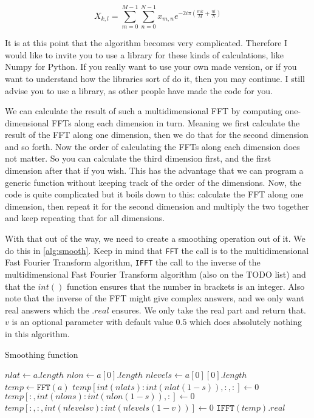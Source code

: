 \begin{equation}
    \label{eq:NFFT}
    X_{k,l} = \sum_{m = 0}^{M - 1}\sum_{n = 0}^{N - 1} x_{m, n}e^{-2i\pi(\frac{mk}{M} + \frac{nl}{N})}
\end{equation}

It is at this point that the algorithm becomes very complicated. Therefore I would like to invite you to use a library for these kinds of calculations, like Numpy \cite{numpy} for Python. If you
really want to use your own made version, or if you want to understand how the libraries sort of do it, then you may continue. I still advise you to use a library, as other people have made the 
code for you. 

We can calculate the result of such a multidimensional FFT by computing one-dimensional FFTs along each dimension in turn. Meaning we first calculate the result of the FFT along one dimension, 
then we do that for the second dimension and so forth. Now the order of calculating the FFTs along each dimension does not matter. So you can calculate the third dimension first, and the first 
dimension after that if you wish. This has the advantage that we can program a generic function without keeping track of the order of the dimensions. Now, the code is quite complicated but it 
boils down to this: calculate the FFT along one dimension, then repeat it for the second dimension and multiply the two together and keep repeating that for all dimensions.

With that out of the way, we need to create a smoothing operation out of it. We do this in \autoref{alg:smooth}. Keep in mind that \texttt{FFT} the call is to the 
multidimensional Fast Fourier Transform algorithm, \texttt{IFFT} the call to the inverse of the multidimensional Fast Fourier Transform algorithm (also on the TODO list) and that the $int()$ 
function ensures that the number in brackets is an integer. Also note that the inverse of the FFT might give complex answers, and we only want real answers which the $.real$ ensures. We only 
take the real part and return that. $v$ is an optional parameter with default value $0.5$ which does absolutely nothing in this algorithm.

\begin{algorithm}
    \caption{Smoothing function}
    \label{alg:smooth}
    $nlat \leftarrow a.length$ \;
    $nlon \leftarrow a[0].length$ \;
    $nlevels \leftarrow a[0][0].length$ \;
    $temp \leftarrow \texttt{FFT}(a)$ \;
    $temp[int(nlat s):int(nlat(1 - s)),:,:] \leftarrow 0$ \;
    $temp[:,int(nlon s):int(nlon(1 - s)),:] \leftarrow 0$ \;
    $temp[:,:,int(nlevels v):int(nlevels(1 - v))] \leftarrow 0$ \;
    \Return $\texttt{IFFT}(temp).real$ \;
\end{algorithm}